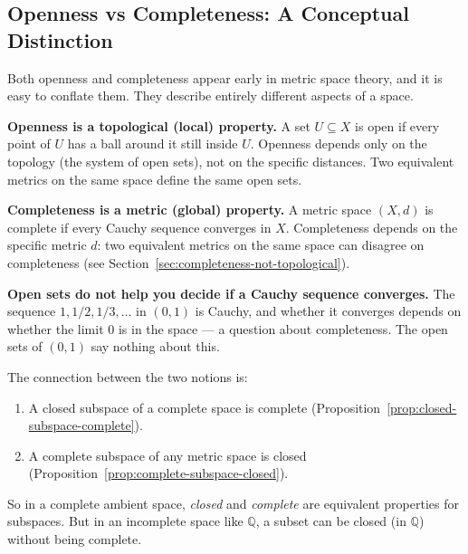 
\subsection*{Openness vs Completeness: A Conceptual Distinction}
\label{sec:openness-vs-completeness-note}

\begin{remark*}
Both openness and completeness appear early in metric space theory,
and it is easy to conflate them. They describe entirely different aspects
of a space.

\medskip
\noindent\textbf{Openness is a topological (local) property.}
A set $U \subseteq X$ is open if every point of $U$ has a ball around it
still inside $U$. Openness depends only on the topology (the system of
open sets), not on the specific distances.
Two equivalent metrics on the same space define the same open sets.

\medskip
\noindent\textbf{Completeness is a metric (global) property.}
A metric space $(X,d)$ is complete if every Cauchy sequence converges
in $X$. Completeness depends on the specific metric $d$:
two equivalent metrics on the same space can disagree on completeness
(see Section~\ref{sec:completeness-not-topological}).

\medskip
\noindent\textbf{Open sets do not help you decide if a Cauchy sequence converges.}
The sequence $1, 1/2, 1/3, \ldots$ in $(0,1)$ is Cauchy, and
whether it converges depends on whether the limit $0$ is in the space ---
a question about completeness. The open sets of $(0,1)$ say nothing about this.
\end{remark*}

\begin{remark*}
The connection between the two notions is:

\begin{enumerate}
  \item A closed subspace of a complete space is complete
        (Proposition~\ref{prop:closed-subspace-complete}).
  \item A complete subspace of any metric space is closed
        (Proposition~\ref{prop:complete-subspace-closed}).
\end{enumerate}

So in a complete ambient space, \emph{closed} and \emph{complete} are equivalent
properties for subspaces. But in an incomplete space like $\mathbb{Q}$,
a subset can be closed (in $\mathbb{Q}$) without being complete.
\end{remark*}
